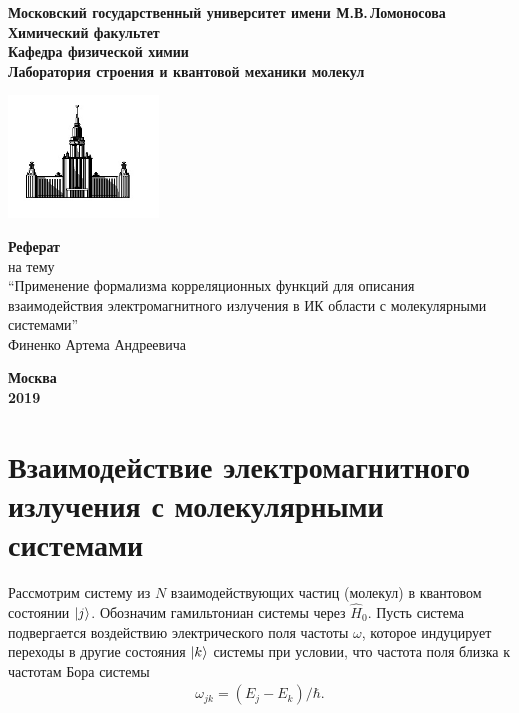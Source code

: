 \documentclass[12pt]{article}
\begin{document}
\begin{titlepage}
\centering
\textbf{\large Московский государственный университет имени М.В.\,Ломоносова\\
\vspace*{0.1cm} Химический факультет\\
\vspace*{0.1cm}
\noindent\makebox[\linewidth]{\rule{\paperwidth}{0.4pt}}
\vspace*{0.1cm}
 Кафедра физической химии\\
\vspace*{0.1cm} Лаборатория строения и квантовой механики молекул \\}

\begin{center}
\includegraphics[width=0.3\textwidth]{pictures/logo.jpg}
\end{center}

\vspace{0.5cm}
{\Large \textbf{Реферат}} \\ \vspace{0.3cm} {\large на тему} \\ \vspace{0.3cm} 
{\large \enquote{Применение формализма корреляционных функций для описания взаимодействия электромагнитного излучения в ИК области с молекулярными системами}} \\ 
\vspace{0.75cm}
{\large Финенко Артема Андреевича}

\vfill
\large\textbf{Москва\\ 2019}
\end{titlepage}



\section{Взаимодействие электромагнитного излучения с молекулярными системами}
Рассмотрим систему из $N$ взаимодействующих частиц (молекул) в квантовом состоянии $\ket{j}$. Обозначим гамильтониан системы через $\hat{H}_0$. Пусть система подвергается воздействию электрического поля частоты $\omega$, которое индуцирует переходы в другие состояния $\ket{k}$ системы при условии, что частота поля близка к частотам Бора системы
%
\begin{gather}
    \omega_{jk} = (E_j - E_k) / \hbar.
\end{gather}
\end{document}
